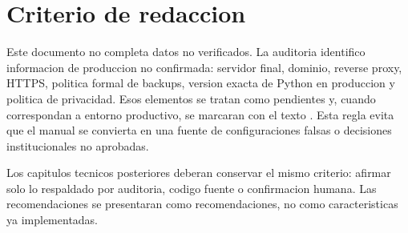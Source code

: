 \section{Criterio de redaccion}
\label{sec:introduccion-criterio}

Este documento no completa datos no verificados. La auditoria identifico informacion de produccion no confirmada: servidor final, dominio, reverse proxy, HTTPS, politica formal de backups, version exacta de Python en produccion y politica de privacidad. Esos elementos se tratan como pendientes y, cuando correspondan a entorno productivo, se marcaran con el texto \MarcadorProduccionPendiente. Esta regla evita que el manual se convierta en una fuente de configuraciones falsas o decisiones institucionales no aprobadas.

Los capitulos tecnicos posteriores deberan conservar el mismo criterio: afirmar solo lo respaldado por auditoria, codigo fuente o confirmacion humana. Las recomendaciones se presentaran como recomendaciones, no como caracteristicas ya implementadas.
